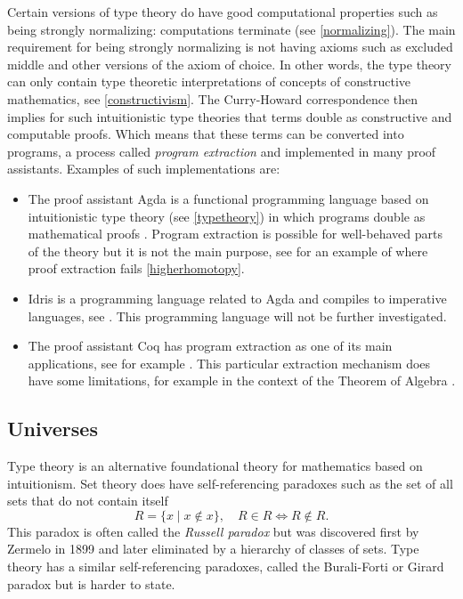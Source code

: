 \documentclass[12pt,a4paper,twoside,xetex]{book} %
\newcommand{\keyword}[1]{\emph{#1}\index{#1}}
\begin{document}
Certain versions of type theory do have good computational properties such as 
being strongly normalizing: computations terminate (see \cref{normalizing}). 
The main requirement for being strongly normalizing is not having axioms such 
as excluded middle and other versions of the axiom of choice. In other words, 
the type theory can only contain type theoretic interpretations of concepts of 
constructive mathematics, see \cref{constructivism}. The Curry-Howard 
correspondence then implies for such intuitionistic type theories that terms 
double as constructive and computable proofs. Which means that these terms can 
be converted into programs, a process called \keyword{program extraction} and 
implemented in many proof assistants. Examples of such implementations are:
\begin{itemize}
\item The proof assistant Agda is a functional programming language based on 
intuitionistic type theory (see \cref{typetheory}) in which programs double as 
mathematical proofs \cite{Abel2019}. Program extraction is possible for 
well-behaved parts of the theory but it is not the main purpose, see for an example of where proof extraction fails \cref{higherhomotopy}.
\item Idris is a programming language related to Agda and compiles to imperative 
languages, see \cite{Brady2018}. This programming language will not be further investigated.
\item   The proof assistant Coq \cite{Arias2019} has program extraction as one 
of its main applications, see for example \cite{Pit-Claudel2018}. This 
particular extraction mechanism does have some limitations, for example in the 
context of the Theorem of Algebra \cite{Cruz-Filipe2005}.
\end{itemize}


\subsection{Universes}\label{universes}

Type theory is an alternative foundational theory for mathematics based on intuitionism. Set theory does have self-referencing paradoxes such as the set of all sets that do not contain itself \[ R = \{x \mid x \not \in x \}, \quad R\in R \Leftrightarrow R \not \in R. \] This paradox is often called the \keyword{Russell paradox} but was discovered first by Zermelo in 1899 and later eliminated by a hierarchy of classes of sets. Type theory has a similar self-referencing paradoxes, called the Burali-Forti or Girard paradox but is harder to state.
\end{document}
